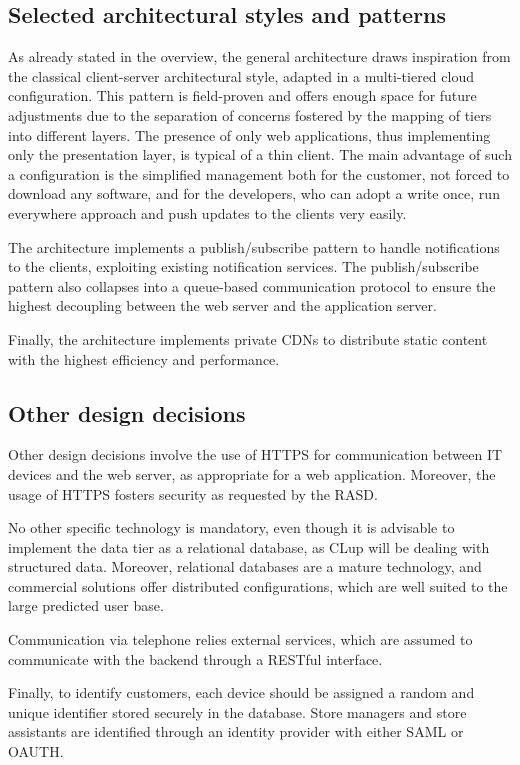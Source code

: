 \documentclass[../../main.tex]{subfiles}
\begin{document}
\subsection{Selected architectural styles and patterns}


    As already stated in the overview, the general architecture draws inspiration from the classical client-server architectural style, adapted in a multi-tiered cloud configuration.  
    This pattern is field-proven and offers enough space for future adjustments due to the separation of concerns fostered by the mapping of tiers into different layers.
    The presence of only web applications, thus implementing only the presentation layer, is typical of a thin client. The main advantage of such a configuration is the simplified management both for the customer, not forced to download any software, and for the developers, who can adopt a write once, run everywhere approach and push updates to the clients very easily.

    The architecture implements a publish/subscribe pattern to handle notifications to the clients, exploiting existing notification services. 
    The publish/subscribe pattern also collapses into a queue-based communication protocol to ensure the highest decoupling between the web server and the application server.

    Finally, the architecture implements private CDNs to distribute static content with the highest efficiency and performance.

\subsection{Other design decisions}


    Other design decisions involve the use of HTTPS for communication between IT devices and the web server, as appropriate for a web application. 
    Moreover, the usage of HTTPS fosters security as requested by the RASD.

    No other specific technology is mandatory, even though it is advisable to implement the data tier as a relational database, 
    as CLup will be dealing with structured data. Moreover, relational databases are a mature technology, and commercial solutions offer distributed configurations, 
    which are well suited to the large predicted user base.

    Communication via telephone relies external services, which are assumed to communicate with the backend through a RESTful interface.

    Finally, to identify customers, each device should be assigned a random and unique identifier stored securely in the database. Store managers and store assistants are identified through
    an identity provider with either SAML or OAUTH. 
\end{document}
